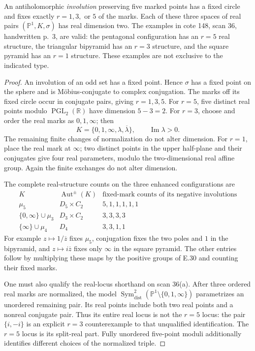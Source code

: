 An antiholomorphic \emph{involution} preserving five marked points
has a fixed circle and fixes exactly $r=1,3,$ or $5$ of the marks.
Each of these three spaces of real pairs $(\mathbb P^1,K,\sigma)$
has real dimension two.  The examples in cote 148, scan 36,
handwritten p.~3, are valid: the pentagonal configuration has an
$r=5$ real structure, the triangular bipyramid has an $r=3$
structure, and the square pyramid has an $r=1$ structure.
These examples are not exclusive to the indicated type.
\begin{proof}
An involution of an odd set has a fixed point.  Hence $\sigma$ has
a fixed point on the sphere and is M\"obius-conjugate to complex
conjugation.  The marks off its fixed circle occur in conjugate
pairs, giving $r=1,3,5$.  For $r=5$, five distinct real points
modulo $\operatorname{PGL}_2(\mathbb R)$ have dimension $5-3=2$.
For $r=3$, choose and order the real marks as $0,1,\infty$; then
\[
 K=\{0,1,\infty,\lambda,\overline\lambda\},
 \qquad\operatorname{Im}\lambda>0.
\]
The remaining finite changes of normalization do not alter dimension.
For $r=1$, place the real mark at $\infty$; two distinct points
in the upper half-plane and their conjugates give four real
parameters, modulo the two-dimensional real affine group.
Again the finite exchanges do not alter dimension.

The complete real-structure counts on the three enhanced
configurations are
\[
\begin{array}{c|c|c}
 K&\operatorname{Aut}^{\pm}(K)&
 \text{fixed-mark counts of its negative involutions}\\\hline
 \mu_5&D_5\times C_2&5,1,1,1,1,1\\
 \{0,\infty\}\cup\mu_3&D_3\times C_2&3,3,3,3\\
 \{\infty\}\cup\mu_4&D_4&3,3,1,1
\end{array}
\]
For example $z\mapsto1/\overline z$ fixes $\mu_5$, conjugation
fixes the two poles and $1$ in the bipyramid, and
$z\mapsto i\overline z$ fixes only $\infty$ in the square pyramid.
The other entries follow by multiplying these maps by the positive
groups of E.30 and counting their fixed marks.

One must also qualify the real-locus shorthand on scan 36(a).
After three ordered real marks are normalized, the model
$\operatorname{Sym}^2_{\mathrm{dist}}(
\mathbb P^1\setminus\{0,1,\infty\})$ parametrizes an unordered
remaining pair.  Its real points include both two real points and
a nonreal conjugate pair.  Thus its entire real locus is not the
$r=5$ locus: the pair $\{i,-i\}$ is an explicit $r=3$ counterexample
to that unqualified identification.  The $r=5$ locus is its
split-real part.  Fully unordered five-point moduli additionally
identifies different choices of the normalized triple.
\end{proof}

